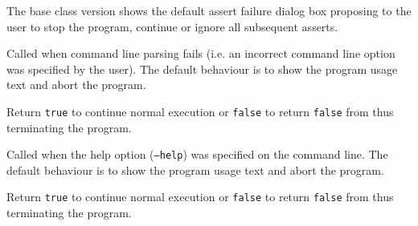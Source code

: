 The base class version shows the default assert failure dialog box proposing to
the user to stop the program, continue or ignore all subsequent asserts.








\label{wxapponcmdlineerror}


Called when command line parsing fails (i.e. an incorrect command line option
was specified by the user). The default behaviour is to show the program usage
text and abort the program.

Return {\tt true} to continue normal execution or {\tt false} to return 
{\tt false} from  thus terminating the program.




\label{wxapponcmdlinehelp}


Called when the help option ({\tt --help}) was specified on the command line.
The default behaviour is to show the program usage text and abort the program.

Return {\tt true} to continue normal execution or {\tt false} to return 
{\tt false} from  thus terminating the program.




\label{wxapponcmdlineparsed}

